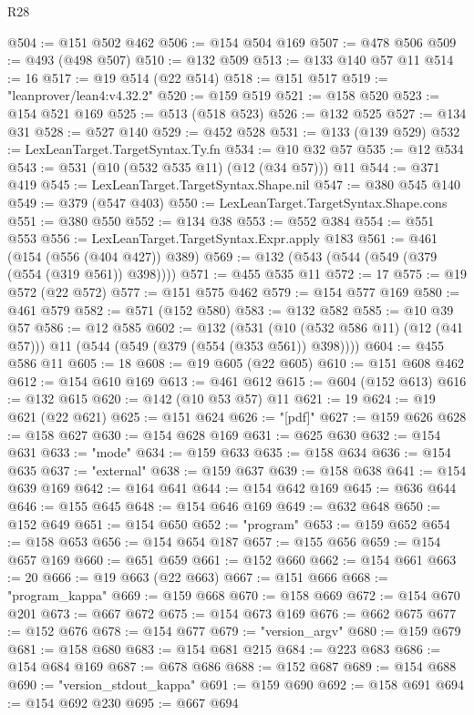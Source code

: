 \begin{lexlean}{R28}
\begin{coremodule}
@504 := @151 @502 @462
@506 := @154 @504 @169
@507 := @478 @506
@509 := @493 (@498 @507)
@510 := @132 @509
@513 := @133 @140 @57 @11
@514 := 16
@517 := @19 @514 (@22 @514)
@518 := @151 @517
@519 := "leanprover/lean4:v4.32.2"
@520 := @159 @519
@521 := @158 @520
@523 := @154 @521 @169
@525 := @513 (@518 @523)
@526 := @132 @525
@527 := @134 @31
@528 := @527 @140
@529 := @452 @528
@531 := @133 (@139 @529)
@532 := LexLeanTarget.TargetSyntax.Ty.fn
@534 := @10 @32 @57
@535 := @12 @534
@543 := @531 (@10 (@532 @535 @11) (@12 (@34 @57))) @11
@544 := @371 @419
@545 := LexLeanTarget.TargetSyntax.Shape.nil
@547 := @380 @545 @140
@549 := @379 (@547 @403)
@550 := LexLeanTarget.TargetSyntax.Shape.cons
@551 := @380 @550
@552 := @134 @38
@553 := @552 @384
@554 := @551 @553
@556 := LexLeanTarget.TargetSyntax.Expr.apply @183
@561 := @461 (@154 (@556 (@404 @427)) @389)
@569 := @132 (@543 (@544 (@549 (@379 (@554 (@319 @561)) @398))))
@571 := @455 @535 @11
@572 := 17
@575 := @19 @572 (@22 @572)
@577 := @151 @575 @462
@579 := @154 @577 @169
@580 := @461 @579
@582 := @571 (@152 @580)
@583 := @132 @582
@585 := @10 @39 @57
@586 := @12 @585
@602 := @132
    (@531 (@10 (@532 @586 @11) (@12 (@41 @57))) @11 (@544 (@549 (@379 (@554 (@353 @561)) @398))))
@604 := @455 @586 @11
@605 := 18
@608 := @19 @605 (@22 @605)
@610 := @151 @608 @462
@612 := @154 @610 @169
@613 := @461 @612
@615 := @604 (@152 @613)
@616 := @132 @615
@620 := @142 (@10 @53 @57) @11
@621 := 19
@624 := @19 @621 (@22 @621)
@625 := @151 @624
@626 := "[pdf]"
@627 := @159 @626
@628 := @158 @627
@630 := @154 @628 @169
@631 := @625 @630
@632 := @154 @631
@633 := "mode"
@634 := @159 @633
@635 := @158 @634
@636 := @154 @635
@637 := "external"
@638 := @159 @637
@639 := @158 @638
@641 := @154 @639 @169
@642 := @164 @641
@644 := @154 @642 @169
@645 := @636 @644
@646 := @155 @645
@648 := @154 @646 @169
@649 := @632 @648
@650 := @152 @649
@651 := @154 @650
@652 := "program"
@653 := @159 @652
@654 := @158 @653
@656 := @154 @654 @187
@657 := @155 @656
@659 := @154 @657 @169
@660 := @651 @659
@661 := @152 @660
@662 := @154 @661
@663 := 20
@666 := @19 @663 (@22 @663)
@667 := @151 @666
@668 := "program_kappa"
@669 := @159 @668
@670 := @158 @669
@672 := @154 @670 @201
@673 := @667 @672
@675 := @154 @673 @169
@676 := @662 @675
@677 := @152 @676
@678 := @154 @677
@679 := "version_argv"
@680 := @159 @679
@681 := @158 @680
@683 := @154 @681 @215
@684 := @223 @683
@686 := @154 @684 @169
@687 := @678 @686
@688 := @152 @687
@689 := @154 @688
@690 := "version_stdout_kappa"
@691 := @159 @690
@692 := @158 @691
@694 := @154 @692 @230
@695 := @667 @694

\end{coremodule}
\end{lexlean}
